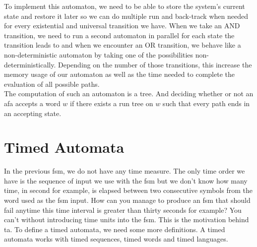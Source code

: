 \documentclass[12pt]{article}
\theoremstyle{definition}
\theoremstyle{definition}
\theoremstyle{remark}
\begin{document}
To implement this automaton, we need to be able to store the system's current state and restore it later so we can do multiple run and back-track when needed for every existential and universal transition we have. When we take an AND transition, we need to run a second automaton in parallel for each state the transition leads to and when we encounter an OR transition, we behave like a non-deterministic automaton by taking one of the possibilities non-deterministically. Depending on the number of those transitions, this increase the memory usage of our automaton as well as the time needed to complete the evaluation of all possible paths.\\

The computation of such an automaton is a tree. And deciding whether or not an \gls{afa} accepts a word $w$ if there exists a run tree on $w$ such that every path ends in an accepting state.~\cite{AFA:2017}\\



\section{Timed Automata}


In the previous \gls{fsm}, we do not have any time measure. The only time order we have is the sequence of input we use with the \gls{fsm} but we don't know how many time, in second for example, is elapsed between two consecutive symbols from the word used as the \gls{fsm} input. How can you manage to produce an \gls{fsm} that should fail anytime this time interval is greater than thirty seconds for example? You can't without introducing time units into the \gls{fsm}. This is the motivation behind \gls{ta}. To define a timed automata, we need some more definitions. A timed automata works with timed sequences, timed words and timed languages.\\
\end{document}
